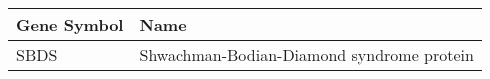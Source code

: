 \begin{tabular}{ll}
\toprule
Gene Symbol &                                      Name \\
\midrule
       SBDS & Shwachman-Bodian-Diamond syndrome protein \\
\bottomrule
\end{tabular}

